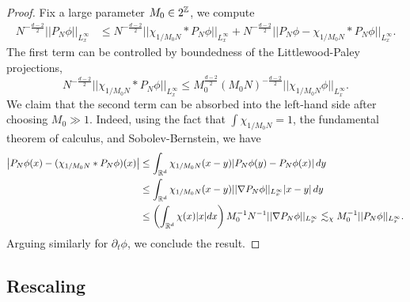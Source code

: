 \begin{proof}
	Fix a large parameter $M_0 \in 2^\mathbb Z$, we compute
		\begin{align*}
			N^{- \frac{d - 2}{2}} ||P_N \phi||_{L^\infty_x}
				&\leq N^{- \frac{d - 2}{2}} ||\chi_{1/M_0 N} * P_N \phi||_{L^\infty_x} + N^{- \frac{d - 2}{2}} ||  P_N \phi -  \chi_{1/M_0 N} * P_N \phi||_{L^\infty_x}.
		\end{align*}
	The first term can be controlled by boundedness of the Littlewood-Paley projections, 
		\[
			N^{- \frac{d - 2}{2}} ||\chi_{1/M_0 N} * P_N \phi||_{L^\infty_x} 
				\leq M_0^{ \frac{d - 2}{2}} (M_0 N)^{- \frac{d - 2}{2}} ||\chi_{1/M_0 N} \phi||_{L^\infty_x}.
		\]
	We claim that the second term can be absorbed into the left-hand side after choosing $M_0 \gg 1$. Indeed, using the fact that $\int \chi_{1/M_0 N} = 1$, the fundamental theorem of calculus, and Sobolev-Bernstein, we have
		\begin{align*}
			\left|P_N \phi (x) - ( \chi_{1/M_0 N} * P_N \phi) (x)\right|
				&\leq \int_{\mathbb R^d} \chi_{1/M_0 N} (x - y) |P_N \phi (y) - P_N \phi (x)| \, d y
				 \\
				&\leq \int_{\mathbb R^d} \chi_{1/M_0 N} (x - y) ||\nabla P_N \phi||_{L^\infty_x} |x - y| \, dy \\
				&\leq \left( \int_{\mathbb R^d} \chi(x) |x| dx \right) M_0^{-1} N^{-1} ||\nabla P_N \phi||_{L^\infty_x} \lesssim_\chi M_0^{-1} ||P_N \phi||_{L^\infty_x}.
		\end{align*}
	Arguing similarly for $\partial_t \phi$, we conclude the result. 
\end{proof}


\subsection{Rescaling}

